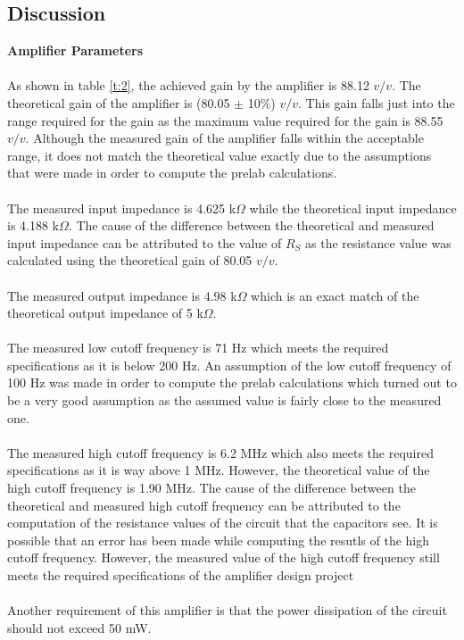 \documentclass{article}
\begin{document}
	\subsection*{Discussion}
	\textbf{Amplifier Parameters}\\\\
	As shown in table \ref{t:2}, the achieved gain by the amplifier is 88.12 $v/v$.
	The theoretical gain of the amplifier is (80.05 $\pm$ 10\%) $v/v$.
	This gain falls just into the range required for the gain as the maximum value required for the gain is 88.55 $v/v$.
	Although the measured gain of the amplifier falls within the acceptable range, it does not match the theoretical value exactly due to the assumptions that were made in order to compute the prelab calculations.\\\\
	The measured input impedance is 4.625 k$\Omega$ while the theoretical input impedance is 4.188 k$\Omega$.
	The cause of the difference between the theoretical and measured input impedance can be attributed to the value of $R_S$ as the resistance value was calculated using the theoretical gain of 80.05 $v/v$.\\\\
	The measured output impedance is 4.98 k$\Omega$ which is an exact match of the theoretical output impedance of 5 k$\Omega$.\\\\
	The measured low cutoff frequency is 71 Hz which meets the required specifications as it is below 200 Hz.
	An assumption of the low cutoff frequency of 100 Hz was made in order to compute the prelab calculations which turned out to be a very good assumption as the assumed value is fairly close to the measured one.\\\\
	The measured high cutoff frequency is 6.2 MHz which also meets the required specifications as it is way above 1 MHz.
	However, the theoretical value of the high cutoff frequency is 1.90 MHz.
	The cause of the difference between the theoretical and measured high cutoff frequency can be attributed to the computation of the resistance values of the circuit that the capacitors see.
	It is possible that an error has been made while computing the resutls of the high cutoff frequency.
	However, the measured value of the high cutoff frequency still meets the required specifications of the amplifier design project\\\\
	Another requirement of this amplifier is that the power dissipation of the circuit should not exceed 50 mW.
\end{document}
